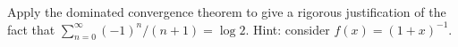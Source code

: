 Apply the dominated convergence theorem to give a rigorous
justification of the fact that $\sum_{n=0}^{\infty}(-1)^n/(n+1)=\log
2.$ Hint: consider $f(x)=(1+x)^{-1}$.
